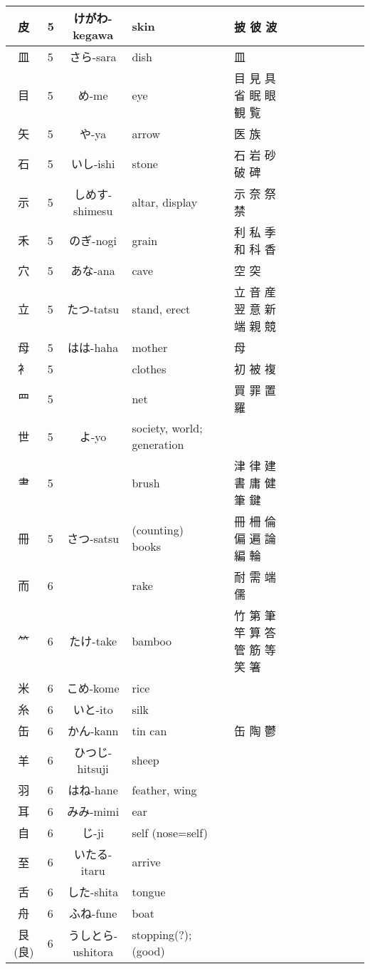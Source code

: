 \documentclass{article}
\begin{document}
{\begin{longtable}{|Cp{1.2cm}|Cp{0.3cm}|Cp{3cm}|Cp{5cm}|Cp{0.5cm}|Cp{5cm}|}
  皮 & 5 & けがわ-kegawa & skin &  & 披 彼 波 \\ \hline
  皿 & 5 & さら-sara & dish &  & 皿 \\ \hline
  目 & 5 & め-me & eye &  & 目 見 具 省 眠 眼 観 覧 \\ \hline
  矢 & 5 & や-ya & arrow &  & 医 族 \\ \hline
  石 & 5 & いし-ishi & stone &  & 石 岩 砂 破 碑 \\ \hline
  示 & 5 & しめす-shimesu & altar, display &  & 示 奈 祭 禁 \\ \hline
  禾 & 5 & のぎ-nogi & grain &  & 利 私 季 和 科 香 \\ \hline
  穴 & 5 & あな-ana & cave &  & 空 突 \\ \hline
  立 & 5 & たつ-tatsu & stand, erect &  & 立 音 産 翌 意 新 端 親 競 \\ \hline
  母 & 5 & はは-haha & mother &  & 母 \\ \hline
  衤 & 5 &  & clothes &  & 初 被 複 \\ \hline
  罒 & 5 &  & net &  & 買 罪 置 羅 \\ \hline
  世 & 5 & よ-yo & society, world; generation &  &  \\ \hline
  ⺻ & 5 &  & brush &  & 津 律 建 書 庸 健 筆 鍵 \\ \hline
  冊 & 5 & さつ-satsu & (counting) books &  & 冊 柵 倫 偏 遍 論 編 輪 \\ \hline
  而 & 6 &  & rake &  & 耐 需 端 儒 \\ \hline
  ⺮ & 6 & たけ-take & bamboo &  & 竹 第 筆 竿 算 答 管 筋 等 笑 箸 \\ \hline
  米 & 6 & こめ-kome & rice &  &  \\ \hline
  糸 & 6 & いと-ito & silk &  &  \\ \hline
  缶 & 6 & かん-kann & tin can &  & 缶 陶 鬱 \\ \hline
  羊 & 6 & ひつじ-hitsuji & sheep &  &  \\ \hline
  羽 & 6 & はね-hane & feather, wing &  &  \\ \hline
  耳 & 6 & みみ-mimi & ear &  &  \\ \hline
  自 & 6 & じ-ji & self (nose=self) &  &  \\ \hline
  至 & 6 & いたる-itaru & arrive &  &  \\ \hline
  舌 & 6 & した-shita & tongue &  &  \\ \hline
  舟 & 6 & ふね-fune & boat &  &  \\ \hline
  艮 (良) & 6 & うしとら-ushitora & stopping(?); (good) &  &  \\ \hline

\end{longtable}}
\end{document}
